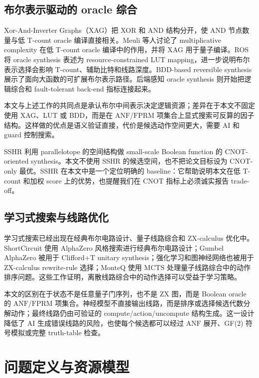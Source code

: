 \documentclass[UTF8,fontset=macnew,11pt]{ctexart}
\newcommand{\anf}{\ensuremath{\mathrm{ANF}}}
\newcommand{\fprm}{\ensuremath{\mathrm{FPRM}}}
\newcommand{\mcts}{\ensuremath{\mathrm{MCTS}}}
\newcommand{\ttable}{truth-table}
\begin{document}
\subsection{布尔表示驱动的 oracle 综合}

Xor-And-Inverter Graphs（XAG）把 XOR 和 AND 结构分开，使 AND 节点数量与低 T-count oracle 编译直接相关。Meuli 等人讨论了 multiplicative complexity 在低 T-count oracle 编译中的作用\cite{meuli2019multiplicative}，并将 XAG 用于量子编译\cite{meuli2022xag}。ROS 将 oracle synthesis 表述为 resource-constrained LUT mapping\cite{meuli2020ros}，进一步说明布尔表示选择会影响 T-count、辅助比特和线路深度。BDD-based reversible synthesis 展示了面向大函数的可扩展布尔表示路径\cite{wille2009bdd}。后端感知 oracle synthesis 则开始把逻辑综合和 fault-tolerant back-end 指标连接起来\cite{yu2025backend}。

本文与上述工作的共同点是承认布尔中间表示决定逻辑资源；差异在于本文不固定使用 XAG、LUT 或 BDD，而是在 \anf{}/\fprm{} 项集合上显式搜索可反算的因子结构。这样做的优点是语义验证直接，代价是候选动作空间更大，需要 AI 和 guard 控制搜索。

SSHR 利用 parallelotope 的空间结构做 small-scale Boolean function 的 CNOT-oriented synthesis\cite{zheng2025sshr}。本文不使用 SSHR 的候选空间，也不把论文目标设为 CNOT-only 最优。SSHR 在本文中是一个定位明确的 baseline：它帮助说明本文在低 T-count 和加权 score 上的优势，也提醒我们在 CNOT 指标上必须诚实报告 trade-off。

\subsection{学习式搜索与线路优化}

学习式搜索已经出现在经典布尔电路设计、量子线路综合和 ZX-calculus 优化中。ShortCircuit 使用 AlphaZero 风格搜索进行经典布尔电路设计\cite{tsaras2024shortcircuit}；Gumbel AlphaZero 被用于 Clifford+T unitary synthesis\cite{rietsch2024unitary}；强化学习和图神经网络也被用于 ZX-calculus rewrite-rule 选择\cite{riu2025rlzx}；MonteQ 使用 \mcts{} 处理量子线路综合中的动作排序问题\cite{machiya2026monteq}。这些工作证明，离散线路综合中的动作选择可以受益于学习策略。

本文的区别在于状态不是任意量子门序列，也不是 ZX 图，而是 Boolean oracle 的 \anf{}/\fprm{} 项集合。神经模型不直接输出线路，而是排序或选择候选代数分解动作；最终线路仍由可验证的 compute/action/uncompute 结构生成。这一设计降低了 AI 生成错误线路的风险，也使每个候选都可以经过 \anf{} 展开、GF(2) 符号模拟或完整 \ttable{} 检查。

\section{问题定义与资源模型}
\end{document}
